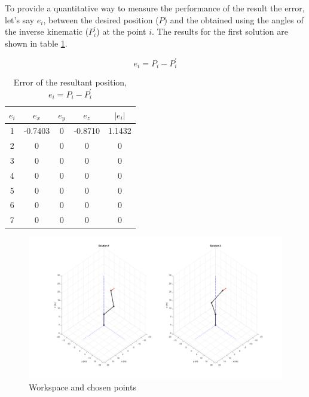 \documentclass{article}
\begin{document}
To provide a quantitative way to measure the performance of the result the error, let's say $e_i$, between the desired position ($P$) and the obtained using the angles of the inverse kinematic ($P_i^{\prime}$) at the point $i$.  The results for the first solution are shown in table \ref{tab:inverse_test.error}.

\begin{equation}
e_i=P_i-P_i^{\prime}
\end{equation}

\begin{table}[h!]
\centering
\begin{tabular}{ c | c c c || c}
 $e_i$ 	& $e_x$ 		& $e_y$	& $e_z$		& $|e_i|$\\ \hline
 1 			& -0.7403 	& 0			& -0.8710		& 1.1432\\
 2 			& 0 				& 0			& 0				& 0\\ 
 3 			& 0 				& 0			& 0				& 0\\ 
 4 			& 0 				& 0			& 0				& 0\\ 
 5 			& 0 				& 0			& 0				& 0\\
 6 			& 0 				& 0			& 0				& 0\\
 7 			& 0 				& 0			& 0				& 0\\
\end{tabular}
\caption{Error of the resultant position, $e_i=P_i-P_i^{\prime}$}
\label{tab:inverse_test.error}
\end{table}

\begin{figure}
\begin{center}
\includegraphics[width=\textwidth]{images/inverse_test}
\caption{Workspace and chosen points}
\label{fig:points.ws_points}
\end{center}
\end{figure}
\end{document}
